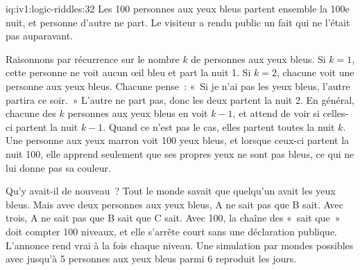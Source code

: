 \begin{solution}{iq:iv1:logic-riddles:32}
Les 100 personnes aux yeux bleus partent ensemble la 100e nuit, et personne d'autre ne part. Le visiteur a rendu public un fait qui ne l'était pas auparavant.

Raisonnons par récurrence sur le nombre $k$ de personnes aux yeux bleus. Si $k = 1$, cette personne ne voit aucun œil bleu et part la nuit 1. Si $k = 2$, chacune voit une personne aux yeux bleus. Chacune pense~: «~Si je n'ai pas les yeux bleus, l'autre partira ce soir.~» L'autre ne part pas, donc les deux partent la nuit 2. En général, chacune des $k$ personnes aux yeux bleus en voit $k - 1$, et attend de voir si celles-ci partent la nuit $k - 1$. Quand ce n'est pas le cas, elles partent toutes la nuit $k$. Une personne aux yeux marron voit 100 yeux bleus, et lorsque ceux-ci partent la nuit 100, elle apprend seulement que ses propres yeux ne sont pas bleus, ce qui ne lui donne pas sa couleur.

Qu'y avait-il de nouveau~? Tout le monde savait que quelqu'un avait les yeux bleus. Mais avec deux personnes aux yeux bleus, A ne sait pas que B sait. Avec trois, A ne sait pas que B sait que C sait. Avec 100, la chaîne des «~sait que~» doit compter 100 niveaux, et elle s'arrête court sans une déclaration publique. L'annonce rend vrai à la fois chaque niveau. Une simulation par mondes possibles avec jusqu'à 5 personnes aux yeux bleus parmi 6 reproduit les jours.

\end{solution}

